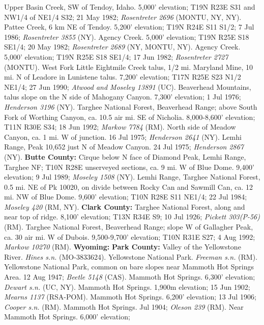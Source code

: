 Upper Basin Creek, SW of Tendoy, Idaho. 5,000' elevation; T19N R23E S31 and
NW1/4 of NE1/4 S32; 21 May 1982; \textit{Rosentreter 2696} (MONTU, NY, NY).
Pattee Creek, 6 km NE of Tendoy. 5,200' elevation; T19N R24E S11 S1/2;
7 Jul 1986; \textit{Rosentreter 3855} (NY).
Agency Creek. 5,000' elevation; T19N R25E S18  SE1/4;
20 May 1982; \textit{Rosentreter 2689} (NY, MONTU, NY).
Agency Creek. 5,000' elevation; T19N R25E S18 SE1/4; 17 Jun 1982;
\textit{Rosentreter 2727} (MONTU).
West Fork Little Eightmile Creek talus, 1/2 mi. Maryland Mine, 10 mi. N of
Leadore in Lunistene talus. 7,200' elevation; T17N R25E S23 N1/2 NE1/4;
27 Jun 1990; \textit{Atwood and Moseley 13891} (UC).
Beaverhead Mountains, talus slope on the N side of Mahogany Canyon.
7,300' elevation; 1 Jul 1976; \textit{Henderson 3196} (NY).
Targhee National Forest, Beaverhead Range; above South Fork of Worthing Canyon,
ca. 10.5 air mi. SE of Nicholia. 8,000-8,600' elevation; T11N R30E S34;
18 Jun 1992; \textit{Markow 7784} (RM).
North side of Meadow Canyon, ca. 1 mi. W of junction. 16 Jul 1975;
\textit{Henderson 2641} (NY).
Lemhi Range, Peak 10,652 just N of Meadow Canyon. 24 Jul 1975;
\textit{Henderson 2867} (NY).
  \textbf{Butte County:}
Cirque below N face of Diamond Peak, Lemhi Range, Targhee NF; T10N R28E
unserveyed sections, ca. 9 mi. W of Blue Dome. 9,400' elevation; 9 Jul 1989;
\textit{Moseley 1508} (NY).
Lemhi Range, Targhee National Forest, 0.5 mi. NE of Pk 10020, on divide between
Rocky Can and Sawmill Can, ca. 12 mi. NW of Blue Dome. 9,600' elevation;
T10N R28E S11 NE1/4; 22 Jul 1984; \textit{Moseley 420} (RM, NY).
  \textbf{Clark County:}
Targhee National Forest, along and near top of ridge. 8,100' elevation;
T13N R34E S9; 10 Jul 1926; \textit{Pickett 303(P-56)} (RM).
Targhee National Forest, Beaverhead Range; slope W of Gallagher Peak, ca. 30
air mi. W of Dubois. 9,500-9,700' elevation; T10N R31E S27; 4 Aug 1992;
\textit{Markow 10270} (RM).
  \textbf{Wyoming:}
  \textbf{Park County:}
Valley of the Yellowstone River. \textit{Hines s.n.} (MO-3833624).
Yellowstone National Park. \textit{Freeman s.n.} (RM).
Yellowstone National Park, common on bare slopes near Mammoth Hot Springs Area.
12 Aug 1947; \textit{Beetle 5148} (CAS).
Mammoth Hot Springs. 6,300' elevation; \textit{Dewart s.n.} (UC, NY).
Mammoth Hot Springs. 1,900m elevation; 15 Jun 1902;
\textit{Mearns 1137} (RSA-POM).
Mammoth Hot Springs. 6,200' elevation; 13 Jul 1906; \textit{Cooper s.n.} (RM).
Mammoth Hot Springs. Jul 1904; \textit{Oleson 239} (RM).
Near Mammoth Hot Springs. 6,000' elevation;
